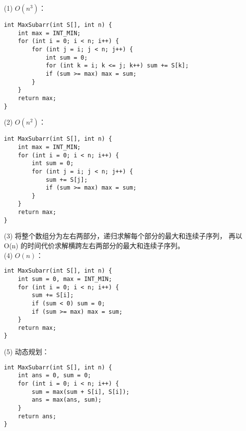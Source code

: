\documentclass[12pt, a4paper, oneside]{ctexart}
\begin{document}
\newpage
\begin{solution}[3.9]
(1) $O(n^3)$：
\begin{verbatim}
int MaxSubarr(int S[], int n) {
    int max = INT_MIN;
    for (int i = 0; i < n; i++) {
        for (int j = i; j < n; j++) {
            int sum = 0;
            for (int k = i; k <= j; k++) sum += S[k];
            if (sum >= max) max = sum;
        }
    }
    return max;
}
\end{verbatim}
(2) $O(n^2)$：
\begin{verbatim}
int MaxSubarr(int S[], int n) {
    int max = INT_MIN;
    for (int i = 0; i < n; i++) {
        int sum = 0;
        for (int j = i; j < n; j++) {
            sum += S[j];
            if (sum >= max) max = sum;
        }
    }
    return max;
}
\end{verbatim}
\newpage
(3) 将整个数组分为左右两部分，递归求解每个部分的最大和连续子序列，
再以 O(n) 的时间代价求解横跨左右两部分的最大和连续子序列。
\\(4) $O(n)$：
\begin{verbatim}
int MaxSubarr(int S[], int n) {
    int sum = 0, max = INT_MIN;
    for (int i = 0; i < n; i++) {
        sum += S[i];
        if (sum < 0) sum = 0;
        if (sum >= max) max = sum;
    }
    return max;
}
\end{verbatim}
(5) 动态规划：
\begin{verbatim}
int MaxSubarr(int S[], int n) {
    int ans = 0, sum = 0;
    for (int i = 0; i < n; i++) {
        sum = max(sum + S[i], S[i]);
        ans = max(ans, sum);
    }
    return ans;
}    
\end{verbatim}
\end{solution}
\end{document}
